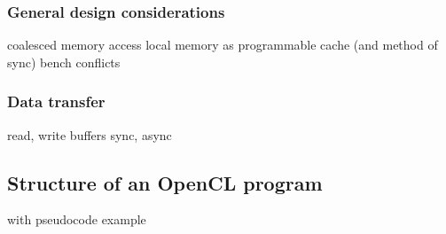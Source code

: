 \subsubsection{General design considerations}
coalesced memory access
local memory as programmable cache (and method of sync)
bench conflicts

\subsubsection{Data transfer}
read, write buffers
sync, async



\subsection{Structure of an OpenCL program}

with pseudocode example

